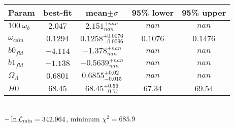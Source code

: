 \begin{tabular}{|l|c|c|c|c|} 
 \hline 
Param & best-fit & mean$\pm\sigma$ & 95\% lower & 95\% upper \\ \hline 
$100~\omega_{b }$ &$2.047$ & $2.151_{nan}^{+nan}$ & $nan$ & $nan$ \\ 
$\omega_{cdm }$ &$0.1294$ & $0.1258_{-0.0096}^{+0.0076}$ & $0.1076$ & $0.1476$ \\ 
$b0_{fld }$ &$-4.114$ & $-1.378_{nan}^{+nan}$ & $nan$ & $nan$ \\ 
$b1_{fld }$ &$-1.138$ & $-0.5639_{nan}^{+nan}$ & $nan$ & $nan$ \\ 
$\Omega_{\Lambda }$ &$0.6801$ & $0.6855_{-0.015}^{+0.02}$ & $nan$ & $nan$ \\ 
$H0$ &$68.45$ & $68.45_{-0.57}^{+0.56}$ & $67.34$ & $69.54$ \\ 
\hline 
 \end{tabular} \\ 
$-\ln{\cal L}_\mathrm{min} =342.964$, minimum $\chi^2=685.9$ \\ 
